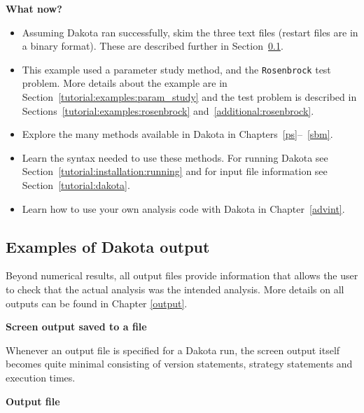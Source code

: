 {\bf What now?}
\begin{itemize}
  \item Assuming Dakota ran successfully, skim the three text files (restart files are in a binary format). These are described further in 
Section~\ref{tutorial:quickstart:output}.
  \item This example used a parameter study method, and the 
\texttt{Rosenbrock} test problem. More details about the example are in
Section~\ref{tutorial:examples:param_study} and the test problem is 
described in Sections~\ref{tutorial:examples:rosenbrock} and~\ref{additional:rosenbrock}.
  \item Explore the many methods available in Dakota in
    Chapters~\ref{ps}--~\ref{sbm}.
  \item Learn the syntax needed to use these methods. For running Dakota 
see Section~\ref{tutorial:installation:running} and for input file 
information see Section~\ref{tutorial:dakota}. 
  \item Learn how to use your own analysis code with Dakota in Chapter~\ref{advint}.
\end{itemize}


\subsection {Examples of Dakota output}\label{tutorial:quickstart:output}
Beyond numerical results, all output files provide information that
allows the user to check that the actual analysis was the intended
analysis. More details on all outputs can be found in Chapter \ref{output}.

{\textbf{Screen output saved to a file}}

Whenever an output file is specified for a Dakota run, the screen output
itself becomes quite minimal 
consisting of version statements, strategy statements
and execution times.

{\textbf{Output file}}

